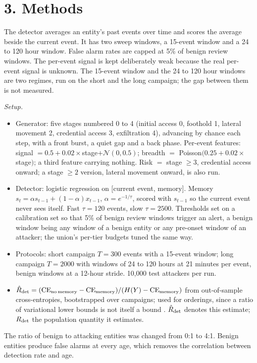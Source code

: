 \documentclass[11pt,letterpaper]{article}
\begin{document}
\section*{3. Methods}
The detector averages an entity's past events over time and scores the average beside the current event. It has two sweep windows, a 15-event window and a 24 to 120 hour window. False alarm rates are capped at 5\% of benign review windows. The per-event signal is kept deliberately weak because the real per-event signal is unknown. The 15-event window and the 24 to 120 hour windows are two regimes, run on the short and the long campaign; the gap between them is not measured.

\noindent\textit{Setup.}
\begin{itemize}
\item Generator: five stages numbered 0 to 4 (initial access 0, foothold 1, lateral movement 2, credential access 3, exfiltration 4), advancing by chance each step, with a front burst, a quiet gap and a back phase. Per-event features: signal $=0.5+0.02\times$stage$+\mathcal{N}(0,0.5)$; breadth $=$ Poisson$(0.25+0.02\times$stage$)$; a third feature carrying nothing. Risk $=$ stage $\ge 3$, credential access onward; a stage $\ge 2$ version, lateral movement onward, is also run.
\item Detector: logistic regression on [current event, memory]. Memory $s_t=\alpha s_{t-1}+(1-\alpha)x_{t-1}$, $\alpha=e^{-1/\tau}$, scored with $s_{t-1}$ so the current event never sees itself. Fast $\tau=120$ events, slow $\tau=2500$. Thresholds set on a calibration set so that 5\% of benign review windows trigger an alert, a benign window being any window of a benign entity or any pre-onset window of an attacker; the union's per-tier budgets tuned the same way.
\item Protocols: short campaign $T=300$ events with a 15-event window; long campaign $T=2000$ with windows of 24 to 120 hours at 21 minutes per event, benign windows at a 12-hour stride. 10,000 test attackers per run.
\item $\hat R_{\rm det}=(\mathrm{CE}_{\rm no\,memory}-\mathrm{CE}_{\rm memory})/(H(Y)-\mathrm{CE}_{\rm memory})$ from out-of-sample cross-entropies, bootstrapped over campaigns; used for orderings, since a ratio of variational lower bounds is not itself a bound \cite{vaillancourt_r}. $\hat R_{\rm det}$ denotes this estimate; $R_{\rm det}$ the population quantity it estimates.
\end{itemize}

The ratio of benign to attacking entities was changed from 0:1 to 4:1. Benign entities produce false alarms at every age, which removes the correlation between detection rate and age.
\end{document}

